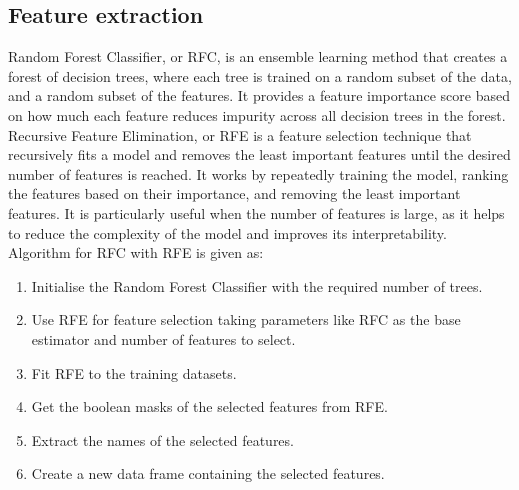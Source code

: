 \subsection{Feature extraction}
\vspace{-18pt}
Random Forest Classifier, or RFC, is an ensemble learning method that creates a forest of decision trees, where each tree is trained on a random subset of the data, and a random subset of the features. It provides a feature importance score based on how much each feature reduces impurity across all decision trees in the forest. Recursive Feature Elimination, or RFE is a feature selection technique that recursively fits a model and removes the least important features until the desired number of features is reached. It works by repeatedly training the model, ranking the features based on their importance, and removing the least important features. It is particularly useful when the number of features is large, as it helps to reduce the complexity of the model and improves its interpretability.
Algorithm for RFC with RFE is given as:
\begin{enumerate}[label=\roman*.]
\item Initialise the Random Forest Classifier with the required number of trees.
\item Use RFE for feature selection taking parameters like RFC as the base estimator and number of features to select.
\item Fit RFE to the training datasets.
\item Get the boolean masks of the selected features from RFE.
\item Extract the names of the selected features.
\item Create a new data frame containing the selected features.
\end{enumerate}
